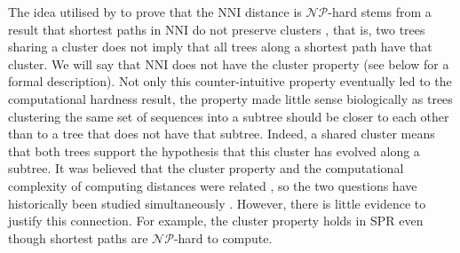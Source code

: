 \documentclass[11pt]{amsart}
\newcommand{\nni}{\mathrm{NNI}}
\newcommand{\spr}{\mathrm{SPR}}
\newcommand{\np}{\mathcal{NP}}
\newcommand{\summary}[1]{} %
\begin{document}
\summary{Historically, the complexity question was following hand in hand with the cluster property -- more history plus biological relevance of the property.}
The idea utilised by \textcite{Dasgupta2000-xa} to prove that the $\nni$ distance is $\np$-hard stems from a result that shortest paths in $\nni$ do not preserve clusters \autocite{Li1996-zw}, that is, two trees sharing a cluster does not imply that all trees along a shortest path have that cluster.
We will say that $\nni$ does not have the cluster property (see below for a formal description).
Not only this counter-intuitive property eventually led to the computational hardness result, the property made little sense biologically as trees clustering the same set of sequences into a subtree should be closer to each other than to a tree that does not have that subtree.
Indeed, a shared cluster means that both trees support the hypothesis that this cluster has evolved along a subtree.
It was believed that the cluster property and the computational complexity of computing distances were related \autocite{Li1996-zw}, so the two questions have historically been studied simultaneously \autocite{Dasgupta2000-xa}.
However, there is little evidence to justify this connection.
For example, the cluster property holds in $\spr$ even though shortest paths are $\np$-hard to compute.
\end{document}
